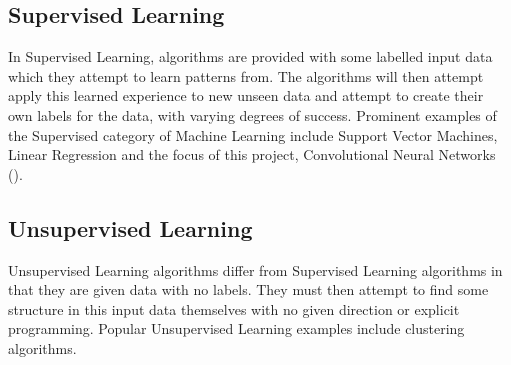 \documentclass[12pt]{report}
\begin{document}
\subsection{Supervised Learning}
\begin{flushleft}
In Supervised Learning, algorithms are provided with some labelled input data which they attempt to learn patterns from. The algorithms will then attempt apply this learned experience to new unseen data and attempt to create their own labels for the data, with varying degrees of success. Prominent examples of the Supervised category of Machine Learning include Support Vector Machines, Linear Regression and the focus of this project, Convolutional Neural Networks (\cite{o2015introduction}).
\end{flushleft}

\subsection{Unsupervised Learning}
\begin{flushleft}
Unsupervised Learning algorithms differ from Supervised Learning algorithms in that they are given data with no labels. They must then attempt to find some structure in this input data themselves with no given direction or explicit programming. Popular Unsupervised Learning examples include clustering algorithms.
\end{flushleft}
\end{document}
